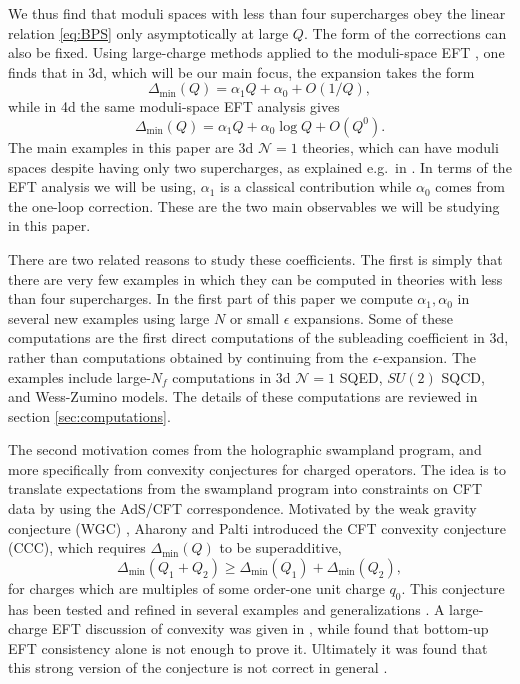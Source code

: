 \documentclass[a4paper,11pt]{article}
\newcommand\Dm{\Delta_{\min}}
\begin{document}
We thus find that moduli spaces with less than four supercharges obey the linear relation \eqref{eq:BPS} only asymptotically at large $Q$. The form of the corrections can also be fixed. Using large-charge methods \cite{Hellerman:2015nra} applied to the moduli-space EFT \cite{Hellerman:2017sur,Hellerman:2017veg,Cuomo:2024fuy}, one finds that in 3d, which will be our main focus, the expansion takes the form
\begin{equation}\label{eq:intro-large-charge-3d}
  \Dm(Q)=\alpha_1 Q+\alpha_0+O(1/Q),
\end{equation}
while in 4d the same moduli-space EFT analysis gives
\begin{equation}\label{eq:intro-large-charge-4d}
  \Dm(Q)=\alpha_1 Q+\alpha_0\log Q+O(Q^0).
\end{equation}
The main examples in this paper are 3d $\mathcal N=1$ theories, which can have moduli spaces despite having only two supercharges, as explained e.g.~in \cite{Gaiotto:2018yjh}. In terms of the EFT analysis we will be using, $\alpha_1$ is a classical contribution while $\alpha_0$ comes from the one-loop correction. These are the two main observables we will be studying in this paper.

There are two related reasons to study these coefficients. The first is simply that there are very few examples in which they can be computed in theories with less than four supercharges. In the first part of this paper we compute $\alpha_1,\alpha_0$ in several new examples using large $N$ or small $\epsilon$ expansions. Some of these computations are the first direct computations of the subleading coefficient in 3d, rather than computations obtained by continuing from the $\epsilon$-expansion. The examples include large-$N_f$ computations in 3d $\mathcal N=1$ SQED, $SU(2)$ SQCD, and Wess-Zumino models. The details of these computations are reviewed in section \ref{sec:computations}.

The second motivation comes from the holographic swampland program, and more specifically from convexity conjectures for charged operators. The idea is to translate expectations from the swampland program into constraints on CFT data by using the AdS/CFT correspondence. Motivated by the weak gravity conjecture (WGC) \cite{ArkaniHamed:2006dz}, Aharony and Palti \cite{Aharony:2021mpc} introduced the CFT convexity conjecture (CCC), which requires $\Dm(Q)$ to be superadditive,
\begin{equation}\label{eq:intro-superadditivity}
  \Dm(Q_1+Q_2)\geq \Dm(Q_1)+\Dm(Q_2),
\end{equation}
for charges which are multiples of some order-one unit charge $q_0$. This conjecture has been tested and refined in several examples and generalizations \cite{Antipin:2021rsh,Aharony:2023cbz,Palti:2022unw}. A large-charge EFT discussion of convexity was given in \cite{Orlando:2023ljh}, while \cite{Cohen:2025slc} found that bottom-up EFT consistency alone is not enough to prove it. Ultimately it was found that this strong version of the conjecture is not correct in general \cite{Sharon:2023wgr}. 
\end{document}
